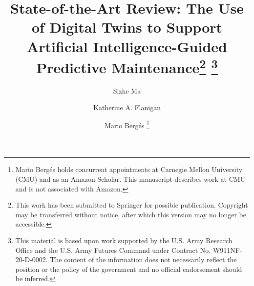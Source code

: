 \documentclass[runningheads]{llncs}
\begin{document}
%
\title{State-of-the-Art Review: The Use of Digital Twins to Support Artificial Intelligence-Guided Predictive Maintenance\thanks{This work has been submitted to Springer for possible publication. Copyright may be transferred without notice, after which this version may no longer be accessible.} \thanks{This material is based upon work supported by the U.S. Army Research Office and the U.S. Army Futures Command under Contract No. W911NF-20-D-0002. The content of the information does not necessarily reflect the position or the policy of the government and no official endorsement should be inferred.}}
%
%


\author{Sizhe Ma \and
Katherine A. Flanigan \and
Mario Berg\'es \thanks{Mario Berg\'es holds concurrent appointments at Carnegie Mellon University (CMU) and as an Amazon Scholar. This manuscript describes work at CMU and is not associated with Amazon.}}
%
%
%
\end{document}
